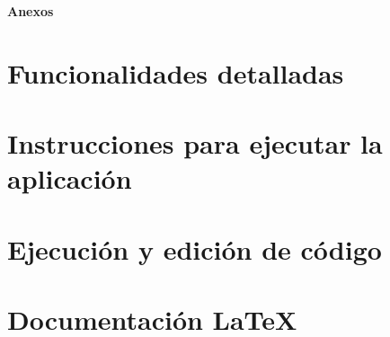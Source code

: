 \documentclass[12pt,twoside,titlepage]{report}
\begin{document}

{}

\footnotesize{
%


}

\normalsize

\raggedbottom
\afterpage{\blankpage}

\newpage





\appendix

{}

\mbox{}
\vfill
\begin{center}
\begin{Huge}
\textbf{Anexos}
\end{Huge}
\end{center}
\vfill
\mbox{}
\thispagestyle{empty}

\newpage
\mbox{}
\thispagestyle{empty}
\newpage


\chapter{Funcionalidades detalladas}
\label{anexo:funcionalidades-detalladas}


\chapter{Instrucciones para ejecutar la aplicación}
\label{anexo:instrucciones-ejecutar-aplicacion}


\chapter{Ejecución y edición de código}
\label{anexo:ejecucion-edicion-codigo}


\chapter{Documentación LaTeX}
\label{anexo:latex}


\end{document}
